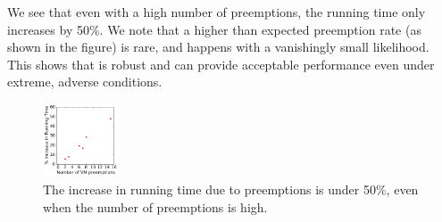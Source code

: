 We see that even with a high number of preemptions, the running time only increases by 50\%. 
We note that a higher than expected preemption rate (as shown in the figure) is rare, and happens with a vanishingly small likelihood. 
This shows that \sysname is robust and can provide acceptable performance even under extreme, adverse conditions. 

\begin{figure}[t]
  \centering 
  \includegraphics[width=0.2\textwidth]{../graphs/confin-fails-vs-time-relative.pdf}
      \vspace*{\myfigspace}
  \caption{The increase in running time due to preemptions is under 50\%, even when the number of preemptions is high.}
  \label{fig:fails-time}
\end{figure}








